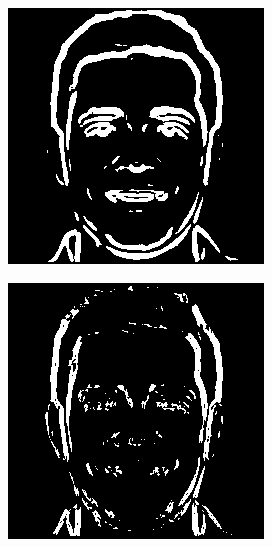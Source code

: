 \documentclass{70_styles/svproc}
\begin{document}
\begin{figure}
     \centering
     \begin{subfigure}[b]{0.2\textwidth}
         \centering
         \includegraphics[width=\textwidth]{70_figures/wem-seed1830.png}
     \end{subfigure}
     \begin{subfigure}[b]{0.2\textwidth}
         \centering
         \includegraphics[width=\textwidth]{70_figures/sem-seed1830.png}

\end{subfigure}
\end{figure}
\end{document}
